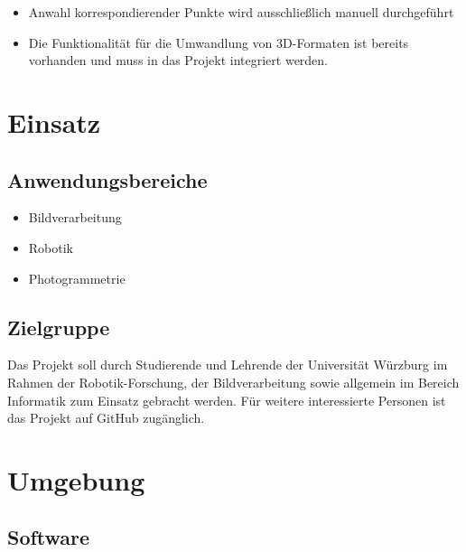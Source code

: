 \documentclass[a4paper,10pt]{scrartcl}
\begin{document}
\begin{itemize}
    \item Anwahl korrespondierender Punkte wird ausschließlich manuell durchgeführt
    \item Die Funktionalität für die Umwandlung von 3D-Formaten ist bereits vorhanden und muss in das Projekt integriert werden.
\end{itemize}


\section{Einsatz}

\subsection{Anwendungsbereiche}
\begin{itemize}
	\item Bildverarbeitung
	\item Robotik
	\item Photogrammetrie
\end{itemize}


\subsection{Zielgruppe}

Das Projekt soll durch Studierende und Lehrende der Universität Würzburg im Rahmen der Robotik-Forschung, der Bildverarbeitung sowie allgemein im Bereich Informatik zum Einsatz gebracht werden. Für weitere interessierte Personen ist das Projekt auf GitHub zugänglich.


\section{Umgebung}

\subsection{Software}
\end{document}
